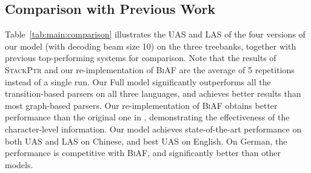 \documentclass[11pt,a4paper]{article}
\begin{document}
\subsection{Comparison with Previous Work}
Table~\ref{tab:main:comparison} illustrates the UAS and LAS of the four versions of our model (with decoding beam size 10) on the three treebanks, together with previous top-performing systems for comparison. 
Note that the results of \textsc{StackPtr} and our re-implementation of \textsc{BiAF} are the average of 5 repetitions instead of a single run.
Our \textsf{Full} model significantly outperforms all the transition-based parsers on all three languages, and achieves better results than most graph-based parsers.
Our re-implementation of \textsc{BiAF} obtains better performance than the original one in \citet{dozat2017:ICLR}, demonstrating the effectiveness of the character-level information.
Our model  achieves state-of-the-art performance on both UAS and LAS on Chinese, and best UAS on English. 
On German, the performance is competitive with \textsc{BiAF}, and significantly better than other models.
\end{document}
